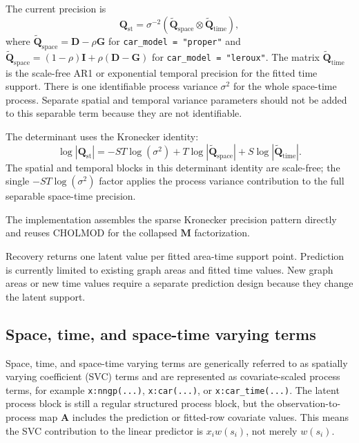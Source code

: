 \documentclass[11pt]{article}
\newcommand{\bA}{\bm{A}}
\newcommand{\bD}{\bm{D}}
\newcommand{\bG}{\bm{G}}
\newcommand{\bI}{\bm{I}}
\newcommand{\bM}{\bm{M}}
\newcommand{\bQ}{\bm{Q}}
\begin{document}
The current precision is
\begin{equation}
  \bQ_{\mathrm{st}}
    = \sigma^{-2}
      (\widetilde{\bQ}_{\mathrm{space}}
       \otimes \widetilde{\bQ}_{\mathrm{time}}),
\end{equation}
where $\widetilde{\bQ}_{\mathrm{space}}=\bD-\rho\bG$ for \texttt{car\_model = "proper"} and $\widetilde{\bQ}_{\mathrm{space}}=(1-\rho)\bI+\rho(\bD-\bG)$ for \texttt{car\_model = "leroux"}. The matrix $\widetilde{\bQ}_{\mathrm{time}}$ is the scale-free AR1 or exponential temporal precision for the fitted time support. There is one identifiable process variance $\sigma^2$ for the whole space-time process. Separate spatial and temporal variance parameters should not be added to this separable term because they are not identifiable.

The determinant uses the Kronecker identity:
\begin{equation}
  \label{eq:logdet-car-time}
  \log|\bQ_{\mathrm{st}}|
    = -ST\log(\sigma^2)
      + T\log|\widetilde{\bQ}_{\mathrm{space}}|
      + S\log|\widetilde{\bQ}_{\mathrm{time}}|.
\end{equation}
The spatial and temporal blocks in this determinant identity are scale-free; the single $-ST\log(\sigma^2)$ factor applies the process variance contribution to the full separable space-time precision.

The implementation assembles the sparse Kronecker precision pattern directly and reuses CHOLMOD for the collapsed $\bM$ factorization.

Recovery returns one latent value per fitted area-time support point. Prediction is currently limited to existing graph areas and fitted time values. New graph areas or new time values require a separate prediction design because they change the latent support.

\subsection{Space, time, and space-time varying terms}

Space, time, and space-time varying terms are generically referred to as spatially varying coefficient (SVC) terms and are represented as covariate-scaled process terms, for example \texttt{x:nngp(...)}, \texttt{x:car(...)}, or \texttt{x:car\_time(...)}. The latent process block is still a regular structured process block, but the observation-to-process map $\bA$ includes the prediction or fitted-row covariate values. This means the SVC contribution to the linear predictor is $x_i w(s_i)$, not merely $w(s_i)$.
\end{document}

